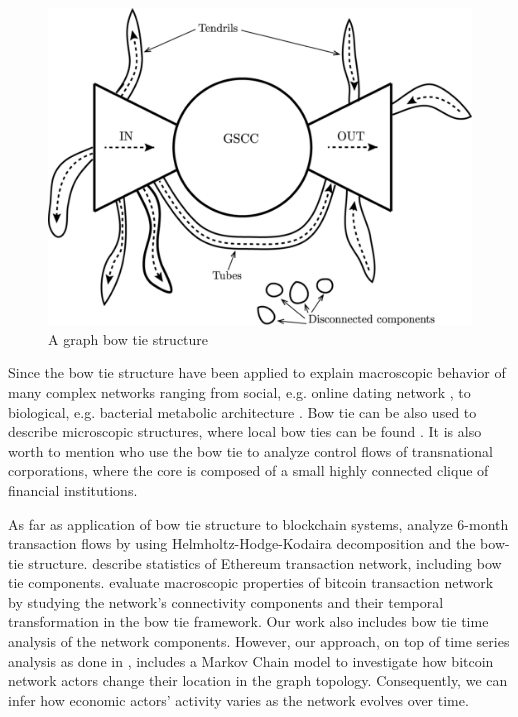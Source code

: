 \documentclass{Resources/netsci-project}
\begin{document}
\begin{figure}[h!]
    \includegraphics[width=\linewidth]{Resources/bowtie.png}
    \caption{A graph bow tie structure \autocite{Fujita2019}} 
    \label{fig:bowtie1}
\end{figure}

Since \textcite{Broder2000} the bow tie structure have been applied to explain macroscopic behavior of many complex networks ranging from social, e.g. online dating network \autocite{Chen2011}, to biological, e.g. bacterial metabolic architecture \autocite{Csete2004}. Bow tie can be also used to describe microscopic structures, where local bow ties can be found \autocite{Mattie2018, Fujita2019}. It is also worth to mention \textcite{Vitali2011} who use the bow tie to analyze control flows of transnational corporations, where the core is composed of a small highly connected clique of financial institutions.

As far as application of bow tie structure to blockchain systems, \textcite{Fujiwara2020} analyze 6-month transaction flows by using Helmholtz-Hodge-Kodaira decomposition and the bow-tie structure. \textcite{Guo2019} describe statistics of Ethereum transaction network, including bow tie components. \textcite{Maesa2019} evaluate macroscopic properties of bitcoin transaction network by studying the network's connectivity components and their temporal transformation in the bow tie framework. Our work also includes bow tie time analysis of the network components. However, our approach, on top of time series analysis as done in \textcite{Maesa2019}, includes a  Markov Chain model to investigate how bitcoin network actors change their location in the graph topology. Consequently, we can infer how economic actors' activity varies as the network evolves over time. 
\end{document}
